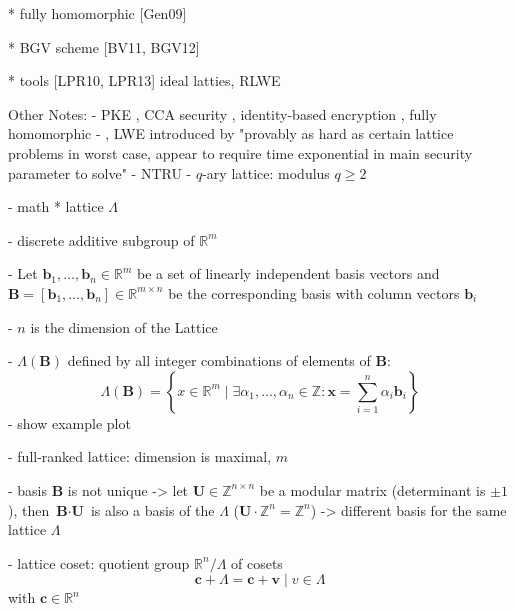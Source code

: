 \documentclass[
  a4paper,  %
  twoside,  %
  bibliography=totoc,
  headsepline,
  cleardoublepage=empty,
  parskip=half,
  draft=false
]{scrbook}
\begin{document}
  * fully homomorphic [Gen09]

  * BGV scheme [BV11, BGV12]

  * tools [LPR10, LPR13] ideal latties, RLWE

Other Notes: %
- PKE \cite{AD97, Reg03, Reg05}, CCA security \cite{PW08, Pei09}, identity-based encryption \cite{GPV08, CHKP10, ABB10}, fully homomorphic \cite{Gen09a}
- , LWE introduced by \cite{Reg05} "provably as hard as certain lattice problems in worst case, appear to require time exponential in main security parameter to solve"
- NTRU \cite{HPS98}
- $q$-ary lattice: modulus $q\geq 2$

- math %
  * lattice $\Lambda$ %

    

    - discrete additive subgroup of $\mathbb{R}^m$ %

    - Let $\textbf{b}_1, \ldots, \textbf{b}_n \in \mathbb{R}^m$ be a set of linearly independent basis vectors and $\textbf{B} = \left[\textbf{b}_1, \ldots, \textbf{b}_n\right] \in \mathbb{R}^{m\times n}$ be the corresponding basis with column vectors $\textbf{b}_i$

    - $n$ is the dimension of the Lattice

    - $\Lambda(\textbf{B})$ defined by all integer combinations of elements of $\textbf{B}$:
    \begin{equation}
      \Lambda(\textbf{B}) = \left\{ x \in \mathbb{R}^m \mid \exists \alpha_1, \ldots, \alpha_n \in \mathbb{Z} : \textbf{x} = \sum_{i=1}^n \alpha_i \textbf{b}_i \right\}
    \end{equation} 
    - show example plot %

    - full-ranked lattice: dimension is maximal, $m$

    - basis $\textbf{B}$ is not unique -> let $\textbf{U}\in \mathbb{Z}^{n\times n}$ be a modular matrix (determinant is $\pm1$), then $\textbf{B}\cdot \textbf{U}$ is also a basis of the $\Lambda$ ($\textbf{U} \cdot \mathbb{Z}^{n} = \mathbb{Z}^{n}$) -> different basis for the same lattice $\Lambda$

    - lattice coset:
      quotient group $\mathbb{R}^n/\Lambda$ of cosets
      \begin{equation*}
        \textbf{c} + \Lambda = {\textbf{c} + \textbf{v} \mid v \in \Lambda}
      \end{equation*}
      with $\textbf{c} \in \mathbb{R}^n$ %
\end{document}
